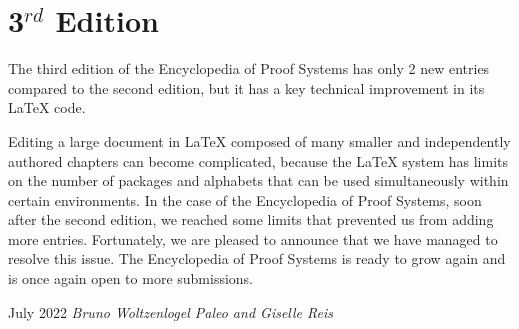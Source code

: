 \preface
\vspace{-150pt}
\section*{3$^{rd}$ Edition}
\vspace{130pt}

The third edition of the Encyclopedia of
Proof Systems has only 2 new entries compared to the second edition, but it has a key technical improvement in its LaTeX code.

Editing a large document in LaTeX composed of many smaller and independently authored chapters can become complicated, because the LaTeX system has limits on the number of packages and alphabets that can be used simultaneously within certain environments. In the case of the Encyclopedia of Proof Systems, soon after the second edition, we reached some limits that prevented us from adding more entries. Fortunately, we are pleased to announce that we have managed to resolve this issue. The Encyclopedia of Proof Systems is ready to grow again and is once again open to more submissions.

\vspace{\baselineskip}
\begin{flushright}\noindent
July 2022 \hfill {\it Bruno Woltzenlogel Paleo and Giselle Reis}
\end{flushright}


